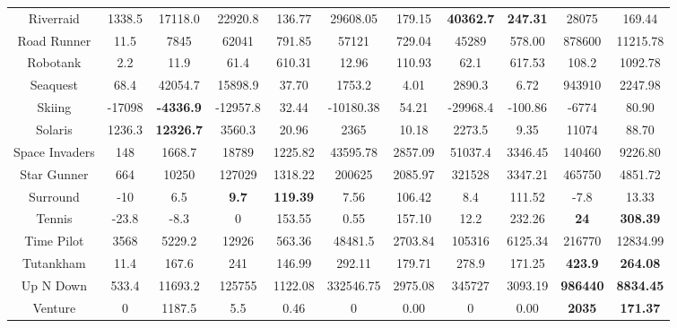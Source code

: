 \documentclass[nohyperref]{article}
\newcommand{\best}[1]{\textbf{#1}}
\theoremstyle{plain}
\begin{document}
\begin{table}[!hb]
\begin{center}
\begin{tabular}{ |c| c| c| c c| c c| c c| c c| }
 Riverraid & 1338.5 & 17118.0       & 22920.8 & 136.77 & 29608.05  & 179.15  & \textbf{40362.7} & \textbf{247.31}   &28075             &169.44             \\
 Road Runner & 11.5 & 7845          & 62041   & 791.85 & 57121     & 729.04  & 45289   & 578.00                     &878600            &11215.78         \\
 Robotank   & 2.2   & 11.9          & 61.4   & 610.31    & 12.96     & 110.93  & 62.1    & 617.53                   &108.2             &1092.78            \\
 Seaquest  & 68.4 & 42054.7         & 15898.9 & 37.70    & 1753.2    & 4.01    & 2890.3  & 6.72                     &943910	           &2247.98  \\
 Skiing & -17098  & \textbf{-4336.9}& -12957.8 & 32.44  & -10180.38 & 54.21   & -29968.4 & -100.86                  &-6774             &80.90          \\
 Solaris & 1236.3 & \textbf{12326.7}& 3560.3  & 20.96  & 2365      & 10.18   & 2273.5   & 9.35                      &11074             &88.70             \\
 Space Invaders & 148 & 1668.7      & 18789 & 1225.82 & 43595.78 & 2857.09 & 51037.4 & 3346.45                      &140460            &9226.80            \\
 Star Gunner & 664 & 10250          & 127029    & 1318.22 & 200625   & 2085.97 & 321528  & 3347.21                  &465750            &4851.72             \\
 Surround    & -10 & 6.5            & \textbf{9.7}       & \textbf{119.39}  & 7.56     & 106.42  & 8.4     & 111.52 &-7.8              &13.33           \\
 Tennis  & -23.8   & -8.3           & 0        & 153.55    & 0.55     & 157.10  & 12.2    & 232.26                  &\best{24       }  &\best{308.39   }   \\
 Time Pilot & 3568 & 5229.2         & 12926 & 563.36     & 48481.5  & 2703.84 & 105316  & 6125.34                   &216770     &12834.99           \\
 Tutankham  & 11.4 & 167.6          & 241   & 146.99     & 292.11   & 179.71  & 278.9   & 171.25                    &\best{423.9 }     &\best{264.08   }   \\
 Up N Down  & 533.4 & 11693.2       & 125755 & 1122.08 & 332546.75 & 2975.08 & 345727 & 3093.19                     &\best{986440}     &\best{8834.45 }   \\
 Venture    & 0     & 1187.5        & 5.5    & 0.46    & 0         & 0.00    & 0      & 0.00                        &\best{2035     }  &\best{171.37   }   \\

\end{tabular}
\end{center}
\end{table}
\end{document}
